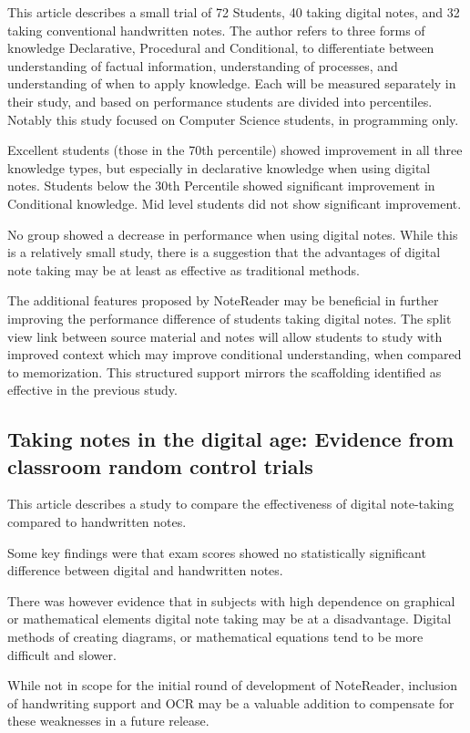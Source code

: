     This article describes a small trial of 72 Students, 40 taking digital notes, and 32 taking conventional handwritten notes. The author refers to three forms of knowledge Declarative, Procedural and Conditional, to differentiate between understanding of factual information, understanding of processes, and understanding of when to apply knowledge. Each will be measured separately in their study, and based on performance students are divided into percentiles. Notably this study focused on Computer Science students, in programming only. 

    Excellent students (those in the 70th percentile) showed improvement in all three knowledge types, but especially in declarative knowledge when using digital notes. Students below the 30th Percentile showed significant improvement in Conditional knowledge. Mid level students did not show significant improvement. 

    No group showed a decrease in performance when using digital notes. While this is a relatively small study, there is a suggestion that the advantages of digital note taking may be at least as effective as traditional methods. 

    The additional features proposed by NoteReader may be beneficial in further improving the performance difference of students taking digital notes. The split view link between source material and notes will allow students to study with improved context which may improve conditional understanding, when compared to memorization. This structured support mirrors the scaffolding identified as effective in the previous study\cite{stacy_note_taking_2015}.

    \subsection{Taking notes in the digital age: Evidence from classroom random control trials\cite{Artz2020}}
    
    This article describes a study to compare the effectiveness of digital note-taking compared to handwritten notes. 

    Some key findings were that exam scores showed no statistically significant difference between digital and handwritten notes. 
    
    There was however evidence that in subjects with high dependence on graphical or mathematical elements digital note taking may be at a disadvantage. Digital methods of creating diagrams, or mathematical equations tend to be more difficult and slower. 

    While not in scope for the initial round of development of NoteReader, inclusion of handwriting support and OCR may be a valuable addition to compensate for these weaknesses in a future release. 